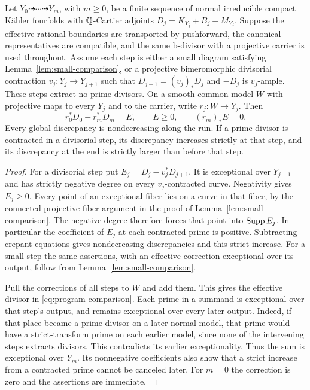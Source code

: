 \begin{lemma}
\label{lem:program-comparison}
Let $Y_0\dashrightarrow\cdots\dashrightarrow Y_m$, with $m\geq0$, be
a finite sequence of normal irreducible compact K\"ahler fourfolds with
$\mathbb{Q}$-Cartier adjoints $D_j=K_{Y_j}+B_j+M_{Y_j}$.  Suppose the effective
rational boundaries are transported by pushforward, the canonical
representatives are compatible, and the same b-divisor with a projective
carrier is used throughout.  Assume
each step is either a small diagram satisfying
Lemma~\ref{lem:small-comparison}, or a projective bimeromorphic
divisorial contraction $v_j:Y_j\to Y_{j+1}$ such that
$D_{j+1}=(v_j)_*D_j$ and $-D_j$ is $v_j$-ample.  These steps extract
no prime divisors.  On a smooth common model $W$ with projective maps
to every $Y_j$ and to the carrier, write $r_j:W\to Y_j$.  Then
\begin{equation}\label{eq:program-comparison}
 r_0^*D_0-r_m^*D_m=E,\qquad E\geq0,\qquad (r_m)_*E=0.
\end{equation}
Every global discrepancy is nondecreasing along the run.  If a prime
divisor is contracted in a divisorial step, its discrepancy increases
strictly at that step, and its discrepancy at the end is strictly
larger than before that step.
\end{lemma}

\begin{proof}
For a divisorial step put
$E_j=D_j-v_j^*D_{j+1}$.  It is exceptional over $Y_{j+1}$ and has
strictly negative degree on every $v_j$-contracted curve.  Negativity
gives $E_j\geq0$.  Every point of an exceptional fiber lies on a curve
in that fiber, by the connected projective fiber argument in the proof
of Lemma~\ref{lem:small-comparison}.  The negative degree therefore
forces that point into $\operatorname{Supp} E_j$.  In particular the coefficient of
$E_j$ at each contracted prime is positive.  Subtracting crepant
equations gives nondecreasing discrepancies and this strict increase.
For a small step the same assertions, with an effective correction
exceptional over its output, follow from
Lemma~\ref{lem:small-comparison}.

Pull the corrections of all steps to $W$ and add them.  This gives the
effective divisor in \eqref{eq:program-comparison}.  Each prime in a
summand is exceptional over that step's output, and remains exceptional
over every later output.  Indeed, if that place became a prime divisor
on a later normal model, that prime would have a strict-transform prime
on each earlier model, since none of the intervening steps extracts divisors.
This contradicts its earlier exceptionality.  Thus the sum is
exceptional over $Y_m$.  Its nonnegative coefficients also show that
a strict increase from a contracted prime cannot be canceled later.
For $m=0$ the correction is zero and the assertions are immediate.
\end{proof}

